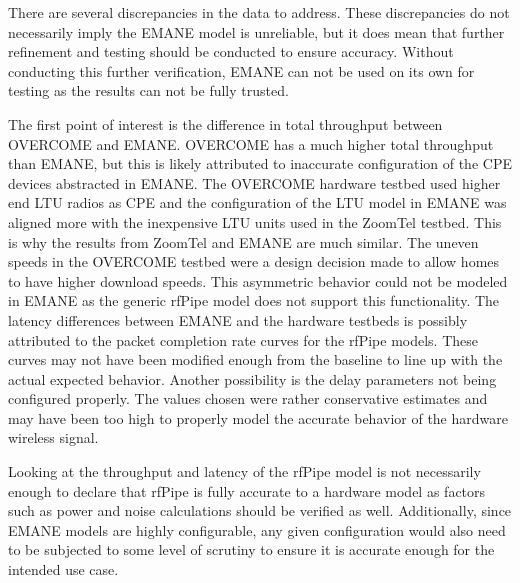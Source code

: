 There are several discrepancies in the data to address.
These discrepancies do not necessarily imply the EMANE model is unreliable, but it does mean that further refinement and testing should be conducted to ensure accuracy.
Without conducting this further verification, EMANE can not be used on its own for testing as the results can not be fully trusted.\par
The first point of interest is the difference in total throughput between OVERCOME and EMANE.
OVERCOME has a much higher total throughput than EMANE, but this is likely attributed to inaccurate configuration of the CPE devices abstracted in EMANE.
The OVERCOME hardware testbed used higher end LTU radios as CPE and the configuration of the LTU model in EMANE was aligned more with the inexpensive LTU units used in the ZoomTel testbed.
This is why the results from ZoomTel and EMANE are much similar.
The uneven speeds in the OVERCOME testbed were a design decision made to allow homes to have higher download speeds.
This asymmetric behavior could not be modeled in EMANE as the generic rfPipe model does not support this functionality.
The latency differences between EMANE and the hardware testbeds is possibly attributed to the packet completion rate curves for the rfPipe models.
These curves may not have been modified enough from the baseline to line up with the actual expected behavior.
Another possibility is the delay parameters not being configured properly.
The values chosen were rather conservative estimates and may have been too high to properly model the accurate behavior of the hardware wireless signal.\par
Looking at the throughput and latency of the rfPipe model is not necessarily enough to declare that rfPipe is fully accurate to a hardware model as factors such as power and noise calculations should be verified as well.
Additionally, since EMANE models are highly configurable, any given configuration would also need to be subjected to some level of scrutiny to ensure it is accurate enough for the intended use case.

